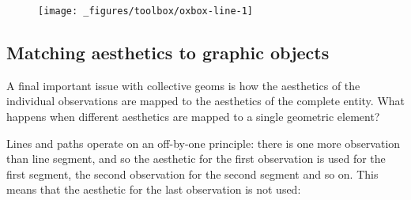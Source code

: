 \begin{figure}[H]
  \centering
  \texttt{[image: \_figures/toolbox/oxbox-line-1]}
\end{figure}

\subsection{Matching aesthetics to graphic objects}\label{sub:matching}

A final important issue with collective geoms is how the aesthetics of
the individual observations are mapped to the aesthetics of the complete
entity. What happens when different aesthetics are mapped to a single
geometric element? 

Lines and paths operate on an off-by-one principle: there is one more
observation than line segment, and so the aesthetic for the first
observation is used for the first segment, the second observation for
the second segment and so on. This means that the aesthetic for the last
observation is not used:

\begin{Shaded}
\begin{Highlighting}[]
\StringTok{ }\NormalTok{(} \NormalTok{:}\NormalTok{, } \NormalTok{:}\NormalTok{, } \NormalTok{(}\NormalTok{,}\NormalTok{,}\NormalTok{))}

 \StringTok{ }
\StringTok{  }\NormalTok{(}\NormalTok{(} \NormalTok{), } \NormalTok{) +}
\StringTok{  }\NormalTok{(} \NormalTok{)}

 \StringTok{ }
\StringTok{  }\NormalTok{(}\NormalTok{(} \NormalTok{), } \NormalTok{) +}
\StringTok{  }\NormalTok{(} \NormalTok{)}
\end{Highlighting}
\end{Shaded}

